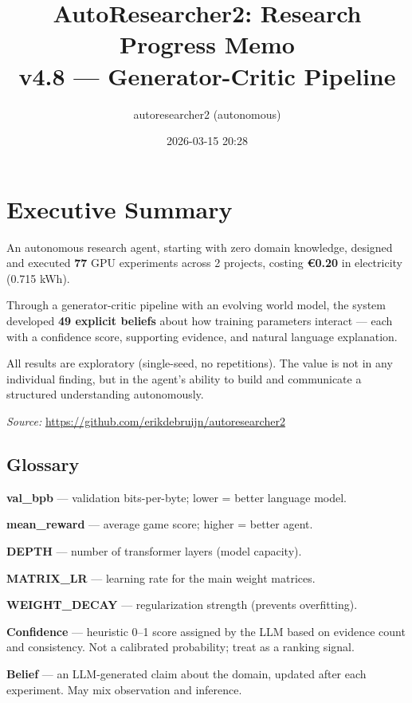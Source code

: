 \documentclass[10pt,a4paper,twocolumn]{article}
\title{\textbf{AutoResearcher2: Research Progress Memo}\\[0.3em]
           \large v4.8 --- Generator-Critic Pipeline}
\author{autoresearcher2 (autonomous)}
\date{2026-03-15 20:28}
\begin{document}
    \maketitle
    \thispagestyle{empty}

    \section*{Executive Summary}

    An autonomous research agent, starting with zero domain knowledge,
    designed and executed \textbf{77} GPU experiments
    across 2 projects,
    costing \textbf{\euro{}0.20} in electricity
    (0.715 kWh). 

    Through a generator-critic pipeline with an evolving world model,
    the system developed \textbf{49 explicit beliefs}
    about how training parameters interact --- each with a confidence score,
    supporting evidence, and natural language explanation.

    All results are exploratory (single-seed, no repetitions).
    The value is not in any individual finding, but in the agent's ability
    to build and communicate a structured understanding autonomously.

    \smallskip
    \noindent\textit{Source:} \url{https://github.com/erikdebruijn/autoresearcher2}

    \subsection*{Glossary}
    \small

    \textbf{val\_bpb} --- validation bits-per-byte; lower = better language model.

    \textbf{mean\_reward} --- average game score; higher = better agent.

    \textbf{DEPTH} --- number of transformer layers (model capacity).

    \textbf{MATRIX\_LR} --- learning rate for the main weight matrices.

    \textbf{WEIGHT\_DECAY} --- regularization strength (prevents overfitting).

    \textbf{Confidence} --- heuristic 0--1 score assigned by the LLM based on evidence count and consistency. Not a calibrated probability; treat as a ranking signal.

    \textbf{Belief} --- an LLM-generated claim about the domain, updated after each experiment. May mix observation and inference.
\end{document}
